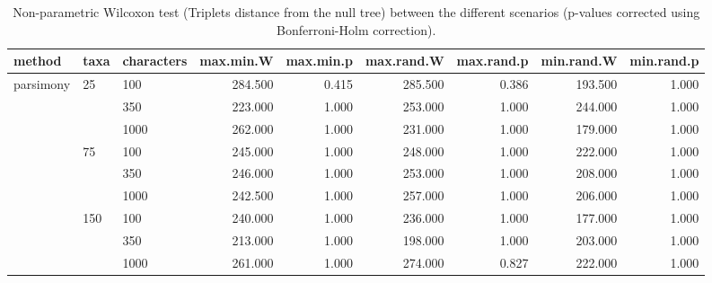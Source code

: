 \begin{table}[ht]
\centering
\begin{tabular}{lllrrrrrr}
  \hline
method & taxa & characters & max.min.W & max.min.p & max.rand.W & max.rand.p & min.rand.W & min.rand.p \\ 
  \hline
parsimony & 25 & 100 & 284.500 & 0.415 & 285.500 & 0.386 & 193.500 & 1.000 \\ 
   &  & 350 & 223.000 & 1.000 & 253.000 & 1.000 & 244.000 & 1.000 \\ 
   &  & 1000 & 262.000 & 1.000 & 231.000 & 1.000 & 179.000 & 1.000 \\ 
   & 75 & 100 & 245.000 & 1.000 & 248.000 & 1.000 & 222.000 & 1.000 \\ 
   &  & 350 & 246.000 & 1.000 & 253.000 & 1.000 & 208.000 & 1.000 \\ 
   &  & 1000 & 242.500 & 1.000 & 257.000 & 1.000 & 206.000 & 1.000 \\ 
   & 150 & 100 & 240.000 & 1.000 & 236.000 & 1.000 & 177.000 & 1.000 \\ 
   &  & 350 & 213.000 & 1.000 & 198.000 & 1.000 & 203.000 & 1.000 \\ 
   &  & 1000 & 261.000 & 1.000 & 274.000 & 0.827 & 222.000 & 1.000 \\ 
   \hline
\end{tabular}
\caption{Non-parametric Wilcoxon test (Triplets distance from the null tree) between the different scenarios (p-values corrected using Bonferroni-Holm correction).} 
\label{Full_Tab_Parsimony_WXTrnull}
\end{table}
